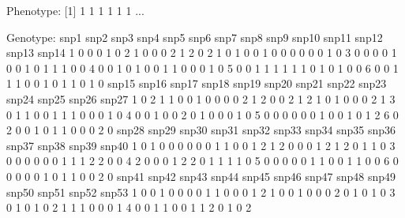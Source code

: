 \documentclass{article}
\begin{document}
\begin{Schunk}
\begin{Soutput}
Phenotype:
[1] 1 1 1 1 1 1
...

Genotype:
  snp1 snp2 snp3 snp4 snp5 snp6 snp7 snp8 snp9 snp10 snp11 snp12 snp13 snp14
1    0    0    0    1    0    2    1    0    0     0     2     1     2     0
2    1    0    1    0    0    1    0    0    0     0     0     0     1     0
3    0    0    0    0    1    0    0    1    0     1     1     1     0     0
4    0    0    1    0    1    0    0    1    1     0     0     0     1     0
5    0    0    1    1    1    1    1    1    0     1     0     1     0     0
6    0    0    1    1    1    0    0    1    0     1     1     0     1     0
  snp15 snp16 snp17 snp18 snp19 snp20 snp21 snp22 snp23 snp24 snp25 snp26 snp27
1     0     2     1     1     0     0     1     0     0     0     0     2     1
2     0     0     2     1     2     1     0     1     0     0     0     2     1
3     0     1     1     0     0     1     1     1     0     0     0     1     0
4     0     0     1     0     0     2     0     1     0     0     0     1     0
5     0     0     0     0     0     0     1     0     0     1     0     1     2
6     0     2     0     0     1     0     1     1     0     0     0     2     0
  snp28 snp29 snp30 snp31 snp32 snp33 snp34 snp35 snp36 snp37 snp38 snp39 snp40
1     0     1     0     0     0     0     0     0     1     1     0     0     1
2     1     2     0     0     0     1     2     1     2     0     1     1     0
3     0     0     0     0     0     0     1     1     1     2     2     0     0
4     2     0     0     0     1     2     2     0     1     1     1     1     0
5     0     0     0     0     0     1     1     0     0     1     1     0     0
6     0     0     0     0     0     1     0     1     1     0     0     2     0
  snp41 snp42 snp43 snp44 snp45 snp46 snp47 snp48 snp49 snp50 snp51 snp52 snp53
1     0     0     1     0     0     0     0     1     1     0     0     0     1
2     1     0     0     1     0     0     0     2     0     1     0     1     0
3     0     1     0     1     0     2     1     1     1     0     0     0     1
4     0     0     1     1     0     0     1     1     2     0     1     0     2

\end{Soutput}
\end{Schunk}
\end{document}
